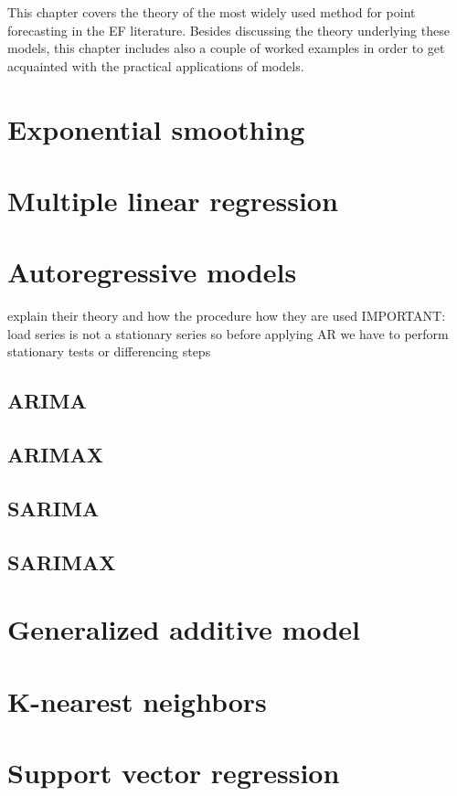 This chapter covers the theory of the most widely used method for point forecasting in the EF literature. Besides discussing the theory underlying these models, this chapter includes also a couple of worked examples in order to get acquainted with the practical applications of models.
\section{Exponential smoothing}

\section{Multiple linear regression}

\section{Autoregressive models}
explain their theory
and how the procedure how they are used
IMPORTANT: load series is not a stationary series so before applying AR we have to perform stationary tests or differencing steps
\subsection{ARIMA}
\subsection{ARIMAX}
\subsection{SARIMA}
\subsection{SARIMAX}

\section{Generalized additive model}

\section{K-nearest neighbors}

\section{Support vector regression}

